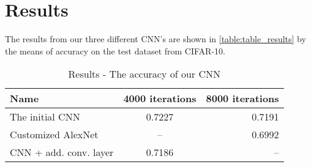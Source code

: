 \graphicspath{{Chapters/Project/}}

\section{Results} %
\label{sec:results}

The results from our three different CNN's are shown in
\autoref{table:table_results} by the means of accuracy on the test dataset from
CIFAR-10. 

\vspace{3 mm} %
\begin{table}[H]
\centering
\sffamily
\small
\begin{tabular}{l | c r}
\toprule
Name 					& 4000 iterations		& 8000 iterations	\\
\midrule 
The initial CNN 		& 0.7227				& 0.7191			\\ 
Customized AlexNet		& -- 					& 0.6992	 		\\ 
CNN + add. conv. layer	& 0.7186				& --				\\ 
\bottomrule 
\end{tabular}
\caption[Short caption]{Results - The accuracy of our CNN}
\label{table:table_results}
\end{table}

